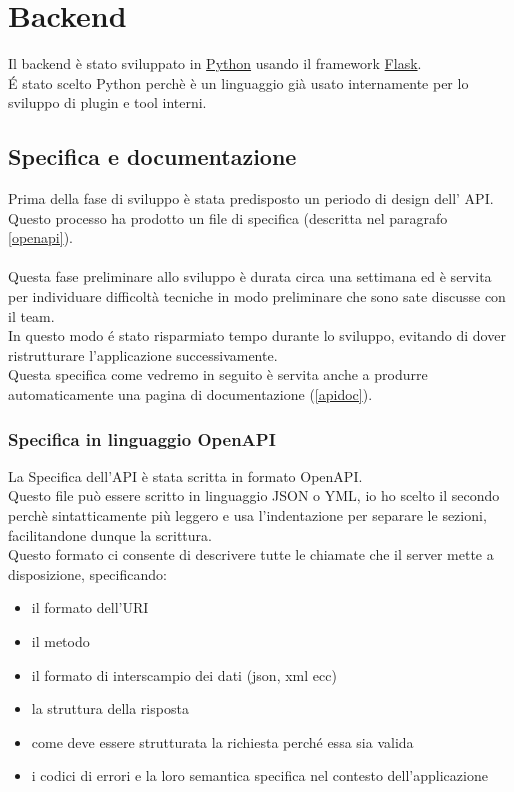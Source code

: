 \chapter{Backend}
        Il backend è stato sviluppato in \href{https://www.python.org}{Python} usando il framework \href{https://flask.palletsprojects.com/en/1.1.x/}{Flask}.\\
        \'E stato scelto Python perchè è un linguaggio già usato internamente per lo sviluppo di plugin e tool interni.

        \section{Specifica e documentazione}
            Prima della fase di sviluppo è stata predisposto un periodo di design dell' API.\\
            Questo processo ha prodotto un file di specifica (descritta nel paragrafo 
            \ref{openapi}).\\\\
            Questa fase preliminare allo sviluppo è durata circa una settimana ed è servita per 
            individuare difficoltà tecniche in modo preliminare che sono sate discusse con il team.\\
            In questo modo \'e stato risparmiato tempo durante lo sviluppo, evitando di dover ristrutturare l'applicazione successivamente.\\
            Questa specifica come vedremo in seguito è servita anche a produrre automaticamente una pagina di documentazione (\ref{apidoc}).
            
            \subsection{Specifica in linguaggio OpenAPI\label{openapi}}
                La Specifica dell'API è stata scritta in formato OpenAPI.\\
                Questo file può essere scritto in linguaggio JSON o YML, io ho scelto il secondo perchè
                sintatticamente più leggero e usa l'indentazione per separare le sezioni, facilitandone dunque la scrittura. \\
                Questo formato ci consente di descrivere tutte le chiamate che il server 
                mette a disposizione, specificando:
                \begin{itemize}
                    \item il formato dell'URI 
                    \item il metodo
                    \item il formato di interscampio dei dati (json, xml ecc) 
                    \item la struttura della risposta
                    \item come deve essere strutturata la richiesta perch\'e essa sia valida
                        \item i codici di errori e la loro semantica specifica nel contesto dell'applicazione
                \end{itemize}
                
